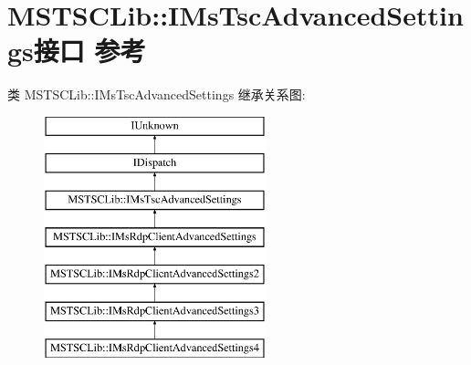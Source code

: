 \hypertarget{interface_m_s_t_s_c_lib_1_1_i_ms_tsc_advanced_settings}{}\section{M\+S\+T\+S\+C\+Lib\+:\+:I\+Ms\+Tsc\+Advanced\+Settings接口 参考}
\label{interface_m_s_t_s_c_lib_1_1_i_ms_tsc_advanced_settings}
类 M\+S\+T\+S\+C\+Lib\+:\+:I\+Ms\+Tsc\+Advanced\+Settings 继承关系图\+:\begin{figure}[H]
\begin{center}
\leavevmode
\includegraphics[height=7.000000cm]{interface_m_s_t_s_c_lib_1_1_i_ms_tsc_advanced_settings}
\end{center}
\end{figure}
